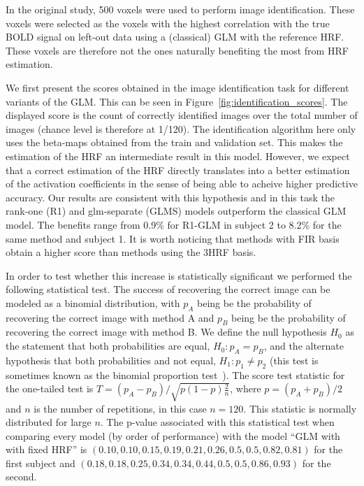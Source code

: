 In the original study, 500 voxels were used to perform image identification. These voxels were selected as the voxels with the highest correlation with the true BOLD signal on left-out data using a (classical) GLM with the reference HRF. These voxels are therefore not the ones naturally benefiting the most from HRF estimation. 


We first present the scores obtained in the image identification task for different variants of the GLM. This can be seen in Figure~\ref{fig:identification_scores}. The displayed score is the count of correctly identified images over the total number of images (chance level is therefore at 1/120). The identification algorithm here only uses the beta-maps obtained from the train and validation set. This makes the estimation of the HRF an intermediate result in this model. However, we expect that a correct estimation of the HRF directly translates into a better estimation of the activation coefficients in the sense of being able to acheive higher predictive accuracy. Our results are consistent with this hypothesis and in this task the rank-one (R1) and glm-separate (GLMS) models outperform the classical \gls{GLM} model. The benefits range from 0.9\% for R1-GLM in subject 2 to 8.2\% for the same method and subject 1. It is worth noticing that methods with FIR basis obtain a higher score than methods using the 3HRF basis.

In order to test whether this increase is statistically significant we performed the following statistical test. The success of recovering the correct image can be modeled as a binomial distribution, with $p_A$ being be the probability of recovering the correct image with method A and $p_{{B}}$ being be the probability of recovering the correct image with method B. We define the null hypothesis $H_0$ as the statement that both probabilities are equal, $H_0: p_A = p_{{B}}$, and the alternate hypothesis that both probabilities and not equal, $H_1: p_1 \neq p_2$ (this test is sometimes known as the binomial proportion test~\citep{rohmel1999unconditional}). The score test statistic for the one-tailed test is $T = {(p_A - p_{{B}})} / {\sqrt{p (1 - p)\frac{2}{n}}}$, where $p = (p_A + p_{{B}}) / 2$ and $n$ is the number of repetitions, in this case $n=120$. This statistic is normally distributed for large $n$. The p-value associated with this statistical test when comparing every model (by order of performance) with the model ``GLM with with fixed HRF'' is $(0.10, 0.10, 0.15, 0.19, 0.21, 0.26, 0.5, 0.5, 0.82, 0.81)$ for the first subject and $(0.18, 0.18, 0.25, 0.34, 0.34, 0.44, 0.5, 0.5, 0.86, 0.93)$ for the second.
%

